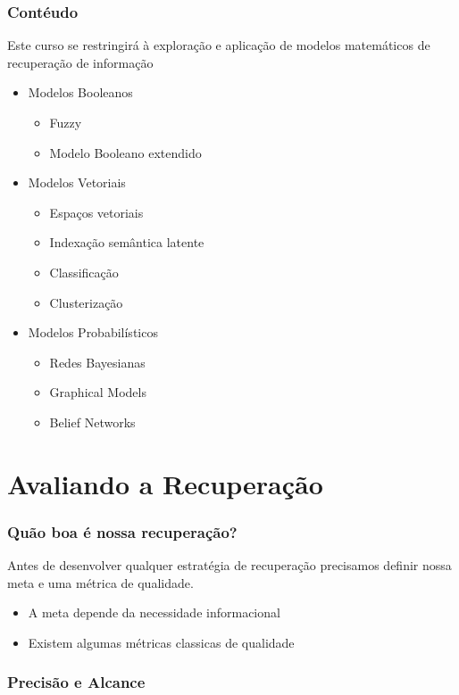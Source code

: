 \documentclass[compress]{beamer}
\begin{document}
\begin{frame}[fragile]
\frametitle{Contéudo}
Este curso se restringirá à exploração e aplicação de modelos matemáticos de recuperação de informação
\begin{itemize}[<+->]
 \item Modelos Booleanos
  \begin{itemize}
    \item Fuzzy
    \item Modelo Booleano extendido
  \end{itemize}
 \item Modelos Vetoriais
  \begin{itemize}
    \item Espaços vetoriais
    \item Indexação semântica latente
    \item Classificação
    \item Clusterização
  \end{itemize}
 \item Modelos Probabilísticos
  \begin{itemize}
    \item Redes Bayesianas
    \item Graphical Models
    \item Belief Networks
  \end{itemize}
\end{itemize}
\end{frame}

\section{Avaliando a Recuperação}
\begin{frame}[fragile]
\frametitle{Quão boa é nossa recuperação?}
Antes de desenvolver qualquer estratégia de recuperação precisamos definir nossa meta e uma métrica de qualidade.
\begin{itemize}[<+->]
 \item A meta depende da necessidade informacional
 \item Existem algumas métricas classicas de qualidade
\end{itemize}
\end{frame}

\begin{frame}[fragile]
\frametitle{Precisão e Alcance}

\end{frame}
\end{document}
